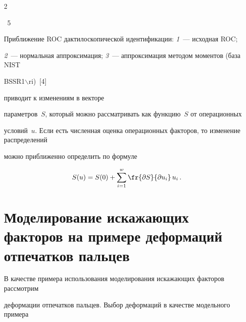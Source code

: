 \begin{multicols}{2}
\begin{center}
\end{center}


\vspace*{6pt}


{{\figurename~5}\ \ \small{Приближение ROC дактилоскопической идентификации: \textit{1}~--- исходная ROC;


\textit{2}~--- нормальная аппроксимация; \textit{3}~--- аппроксимация методом моментов (база NIST 


BSSR1$\backslash$ri)~[4]}}















\bigskip







\noindent


приводит к изменениям в векторе 


параметров~$S$, который можно рассматривать как функцию~$S$ от операционных 


условий~$u$. Если есть численная оценка операционных факторов, то изменение распределений 


можно приближенно определить по формуле


  \begin{equation}


  S(u) =S(0) +\sum\limits_{i=1}^w \fr{\partial S}{\partial u_i}\,u_i\,.


  \label{e5ar}


  \end{equation}





\section{Моделирование искажающих факторов на примере деформаций отпечатков пальцев}





  В качестве примера использования моделирования искажающих факторов рассмотрим 


деформации отпечатков пальцев. Выбор деформаций в качестве модельного примера 



\end{multicols}
